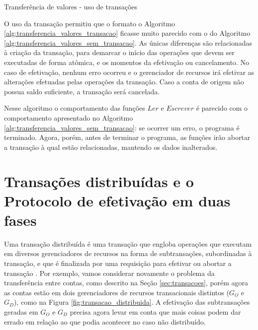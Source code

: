 \documentclass[11pt,twoside,a4paper]{book}
\begin{document}
\begin{algorithm}
\caption{Transferência de valores - uso de transações}
\label{alg:transferencia_valores_transacao}
\dontprintsemicolon
{}
\end{algorithm}

O uso da transação permitiu que o formato o Algoritmo \ref{alg:transferencia_valores_transacao} ficasse muito parecido com o do Algoritmo \ref{alg:transferencia_valores_sem_transacao}. As únicas diferenças são relacionadas à criação da transação, para demarcar o início das operações que devem ser executadas de forma atômica, e os momentos da efetivação ou cancelamento. No caso de efetivação, nenhum erro ocorreu e o gerenciador de recursos irá efetivar as alterações efetuadas pelas operações da transação. Caso a conta de origem não possua saldo suficiente, a transação será cancelada. 

Nesse algoritmo o comportamento das funções $Ler$ e $Escrever$ é parecido com o comportamento apresentado no Algoritmo \ref{alg:transferencia_valores_sem_transacao}: se ocorrer um erro, o programa é terminado. Agora, porém, antes de terminar o programa, as funções irão abortar a transação à qual estão relacionadas, mantendo os dados inalterados. 

\section{Transações distribuídas e o Protocolo de efetivação em duas fases}
\label{sec:transacoes_distribuidas}
\label{sec:2pc}
Uma transação distribuída é uma transação que engloba operações que executam em diversos gerenciadores de recursos na forma de subtransações, subordinadas à transação, e que é finalizada por uma requisição para efetivar ou abortar a transação \cite{gray-lamport}. Por exemplo, vamos considerar novamente o problema da transferência entre contas, como descrito na Seção \ref{sec:transacoes}, porém agora as contas estão em dois gerenciadores de recursos transacionais distintos ($G_O$ e $G_D$), como na Figura \ref{fig:transacao_distribuida}. A efetivação das subtransações geradas em $G_O$ e $G_D$ precisa agora levar em conta que mais coisas podem dar errado em relação ao que podia acontecer no caso não distribuído. 
\end{document}
